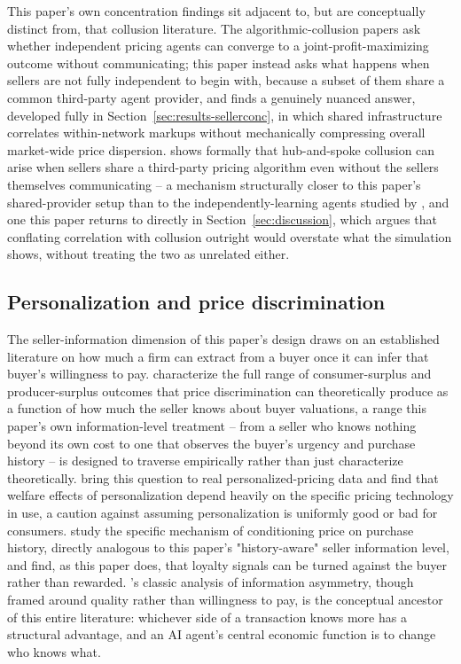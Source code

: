 \documentclass[review]{elsarticle}
\begin{document}
This paper's own concentration findings sit adjacent to, but are conceptually distinct from, that collusion literature. The algorithmic-collusion papers ask whether independent pricing agents can converge to a joint-profit-maximizing outcome without communicating; this paper instead asks what happens when sellers are not fully independent to begin with, because a subset of them share a common third-party agent provider, and finds a genuinely nuanced answer, developed fully in Section~\ref{sec:results-sellerconc}, in which shared infrastructure correlates within-network markups without mechanically compressing overall market-wide price dispersion. \citet{harrington2026hubandspoke} shows formally that hub-and-spoke collusion can arise when sellers share a third-party pricing algorithm even without the sellers themselves communicating -- a mechanism structurally closer to this paper's shared-provider setup than to the independently-learning agents studied by \citet{calvano2020artificial}, and one this paper returns to directly in Section~\ref{sec:discussion}, which argues that conflating correlation with collusion outright would overstate what the simulation shows, without treating the two as unrelated either.

\subsection{Personalization and price discrimination}
\label{sec:litreview-personalization}

The seller-information dimension of this paper's design draws on an established literature on how much a firm can extract from a buyer once it can infer that buyer's willingness to pay. \citet{bergemann2015limits} characterize the full range of consumer-surplus and producer-surplus outcomes that price discrimination can theoretically produce as a function of how much the seller knows about buyer valuations, a range this paper's own information-level treatment -- from a seller who knows nothing beyond its own cost to one that observes the buyer's urgency and purchase history -- is designed to traverse empirically rather than just characterize theoretically. \citet{dube2023personalized} bring this question to real personalized-pricing data and find that welfare effects of personalization depend heavily on the specific pricing technology in use, a caution against assuming personalization is uniformly good or bad for consumers. \citet{acquisti2005conditioning} study the specific mechanism of conditioning price on purchase history, directly analogous to this paper's "history-aware" seller information level, and find, as this paper does, that loyalty signals can be turned against the buyer rather than rewarded. \citet{akerlof1970market}'s classic analysis of information asymmetry, though framed around quality rather than willingness to pay, is the conceptual ancestor of this entire literature: whichever side of a transaction knows more has a structural advantage, and an AI agent's central economic function is to change who knows what.
\end{document}
